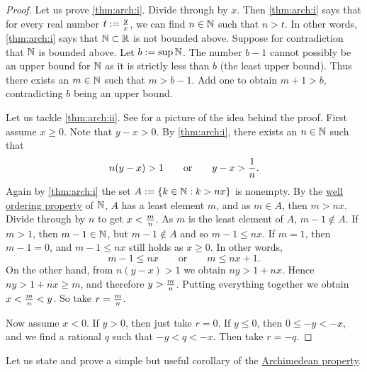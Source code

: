 \begin{proof}
Let us prove \ref{thm:arch:i}.  Divide through by $x$.
Then \ref{thm:arch:i} says that for every real number $t:= \nicefrac{y}{x}$,
we can find $n \in \N$ such that $n > t$.  In other words,
\ref{thm:arch:i} says that $\N \subset \R$ is not bounded above.
Suppose for contradiction that $\N$ is bounded above.  Let $b := \sup \N$.
The number $b-1$ cannot possibly be an upper bound for $\N$ as it is strictly
less than $b$ (the least upper bound).  Thus there exists an $m \in \N$ such that $m > b-1$.
Add one to obtain $m+1 > b$, contradicting $b$ being an
upper bound.

\begin{myfigureht}

\caption{Idea of the proof of the density of $\Q$: Find $n$ such that $y-x >
\nicefrac{1}{n}$, then take the least $m$ such that $\nicefrac{m}{n} > x$.\label{figdensofQ}}
\end{myfigureht}
Let us tackle \ref{thm:arch:ii}.
See 
for a picture of the idea behind the proof.
First assume $x \geq 0$.
Note that $y-x > 0$.
By \ref{thm:arch:i}, there exists an $n \in \N$ such that
\begin{equation*}
n(y-x) > 1
\qquad \text{or} \qquad
y-x > \nicefrac{1}{n}.
\end{equation*}
Again by \ref{thm:arch:i} the set 
$A := \{ k \in \N : k > nx \}$ is nonempty.  By the
\hyperlink{wop:link}{well ordering property}
of $\N$, $A$ has a least element $m$, and as $m \in A$,
then $m > nx$.
Divide through by $n$ to get $x < \nicefrac{m}{n}$.
As $m$ is the least
element of $A$, $m-1 \notin A$.
If $m > 1$, then $m-1 \in \N$, but $m-1 \notin A$ and so $m-1 \leq nx$.
If $m=1$,
then $m-1 = 0$, and $m-1 \leq nx$ still holds as $x \geq 0$.
In other words,
\begin{equation*}
m-1 \leq nx \qquad \text{or} \qquad m \leq nx+1 .
\end{equation*}
On the other hand,
from $n(y-x) > 1$ we obtain $ny > 1+nx$.
Hence $ny > 1+nx \geq m$, and therefore $y > \nicefrac{m}{n}$.
Putting everything together we obtain $x < \nicefrac{m}{n} < y$.
So take $r = \nicefrac{m}{n}$.

Now assume $x < 0$.  If $y > 0$, then just take $r=0$.  If
$y \leq 0$, then $0 \leq -y < -x$, and we
find a rational $q$ such that $-y < q < -x$.  Then take $r = -q$.
\end{proof}

Let us state and prove a simple but useful corollary of the
\hyperref[thm:arch:i]{Archimedean property}.

